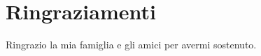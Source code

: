 \documentclass[12pt,a4paper,twoside,openright]{book}
\begin{document}
%
\frontmatter \maketitle \pagestyle{plain} \tableofcontents




%


\mainmatter

\pagestyle{fancy} \fancyhead[LE,RO]{\bfseries\thepage}







\chapter*{Ringraziamenti}

Ringrazio la mia famiglia e gli amici per avermi sostenuto.


%

%
\backmatter
   

%
% 





\end{document}
